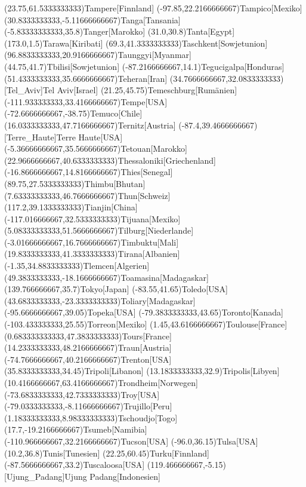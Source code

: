 \mapput(23.75,61.5333333333){Tampere}[Finnland]
\mapput(-97.85,22.2166666667){Tampico}[Mexiko]
\mapput(30.8333333333,-5.11666666667){Tanga}[Tansania]
\mapput(-5.83333333333,35.8){Tanger}[Marokko]
\mapput(31.0,30.8){Tanta}[Egypt]
\mapput(173.0,1.5){Tarawa}[Kiribati]
\mapput(69.3,41.3333333333){Taschkent}[Sowjetunion]
\mapput(96.8833333333,20.9166666667){Taunggyi}[Myanmar]
\mapput(44.75,41.7){Tbilisi}[Sowjetunion]
\mapput(-87.2166666667,14.1){Tegucigalpa}[Honduras]
\mapput(51.4333333333,35.6666666667){Teheran}[Iran]
\mapput(34.7666666667,32.0833333333)[Tel_Aviv]{Tel Aviv}[Israel]
\mapput(21.25,45.75){Temeschburg}[Rumänien]
\mapput(-111.933333333,33.4166666667){Tempe}[USA]
\mapput(-72.6666666667,-38.75){Temuco}[Chile]
\mapput(16.0333333333,47.7166666667){Ternitz}[Austria]
\mapput(-87.4,39.4666666667)[Terre_Haute]{Terre Haute}[USA]
\mapput(-5.36666666667,35.5666666667){Tetouan}[Marokko]
\mapput(22.9666666667,40.6333333333){Thessaloniki}[Griechenland]
\mapput(-16.8666666667,14.8166666667){Thies}[Senegal]
\mapput(89.75,27.5333333333){Thimbu}[Bhutan]
\mapput(7.63333333333,46.7666666667){Thun}[Schweiz]
\mapput(117.2,39.1333333333){Tianjin}[China]
\mapput(-117.016666667,32.5333333333){Tijuana}[Mexiko]
\mapput(5.08333333333,51.5666666667){Tilburg}[Niederlande]
\mapput(-3.01666666667,16.7666666667){Timbuktu}[Mali]
\mapput(19.8333333333,41.3333333333){Tirana}[Albanien]
\mapput(-1.35,34.8833333333){Tlemcen}[Algerien]
\mapput(49.3833333333,-18.1666666667){Toamasina}[Madagaskar]
\mapput(139.766666667,35.7){Tokyo}[Japan]
\mapput(-83.55,41.65){Toledo}[USA]
\mapput(43.6833333333,-23.3333333333){Toliary}[Madagaskar]
\mapput(-95.6666666667,39.05){Topeka}[USA]
\mapput(-79.3833333333,43.65){Toronto}[Kanada]
\mapput(-103.433333333,25.55){Torreon}[Mexiko]
\mapput(1.45,43.6166666667){Toulouse}[France]
\mapput(0.683333333333,47.3833333333){Tours}[France]
\mapput(14.2333333333,48.2166666667){Traun}[Austria]
\mapput(-74.7666666667,40.2166666667){Trenton}[USA]
\mapput(35.8333333333,34.45){Tripoli}[Libanon]
\mapput(13.1833333333,32.9){Tripolis}[Libyen]
\mapput(10.4166666667,63.4166666667){Trondheim}[Norwegen]
\mapput(-73.6833333333,42.7333333333){Troy}[USA]
\mapput(-79.0333333333,-8.11666666667){Trujillo}[Peru]
\mapput(1.18333333333,8.98333333333){Tschoudjo}[Togo]
\mapput(17.7,-19.2166666667){Tsumeb}[Namibia]
\mapput(-110.966666667,32.2166666667){Tucson}[USA]
\mapput(-96.0,36.15){Tulsa}[USA]
\mapput(10.2,36.8){Tunis}[Tunesien]
\mapput(22.25,60.45){Turku}[Finnland]
\mapput(-87.5666666667,33.2){Tuscaloosa}[USA]
\mapput(119.466666667,-5.15)[Ujung_Padang]{Ujung Padang}[Indonesien]

